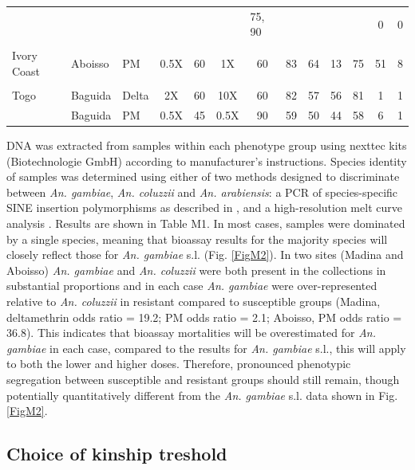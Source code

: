 \documentclass[a4paper,12pt]{article}
\begin{document}
\begin{table}[htbp]
\begin{tabular}{|l|l|l|c|c|c|c|c|c|c|c|c|c|}
 & & & & & & \multicolumn{1}{l|}{75, 90} & & & & & 0 & 0 \\ 
      &          &       &      &    &    &    &    &    &   &   &    &    \\ \hline
Ivory Coast  & Aboisso & PM & 0.5X & 60 & 1X & 60 & 83 & 64 & 13 & 75 & 51 & 8 \\ 
      &          &       &      &    &    &    &    &    &   &   &    &    \\ \hline
Togo & Baguida & Delta & 2X & 60 & 10X & 60 & 82 & 57 & 56 & 81 & 1 & 1 \\ 
 & Baguida & PM & 0.5X & 45 & 0.5X & 90 & 59 & 50 & 44 & 58 & 6 & 1 \\ \hline
\end{tabular}
\label{TabM1}
\end{table}

DNA was extracted from samples within each phenotype group using nexttec kits (Biotechnologie GmbH) according to manufacturer’s instructions. Species identity of samples was determined using either of two methods designed to discriminate between \textit{An. gambiae}, \textit{An. coluzzii} and \textit{An. arabiensis}: a PCR of species-specific SINE insertion polymorphisms as described in \cite{San08}, and a high-resolution melt curve analysis \cite{Cha18}. Results are shown in Table M1. In most cases, samples were dominated by a single species, meaning that bioassay results for the majority species will closely reflect those for \textit{An. gambiae} s.l. (Fig. \ref{FigM2}). In two sites (Madina and Aboisso) \textit{An. gambiae} and \textit{An. coluzzii} were both present in the collections in substantial proportions and in each case \textit{An. gambiae} were over-represented relative to \textit{An. coluzzii} in resistant compared to susceptible groups (Madina, deltamethrin odds ratio = 19.2; PM odds ratio = 2.1; Aboisso, PM odds ratio = 36.8). This indicates that bioassay mortalities will be overestimated for \textit{An. gambiae} in each case, compared to the results for \textit{An. gambiae} s.l., this will apply to both the lower and higher doses. Therefore, pronounced phenotypic segregation between susceptible and resistant groups should still remain, though potentially quantitatively different from the \textit{An. gambiae} s.l. data shown in Fig. \ref{FigM2}.

\clearpage

\subsection{Choice of kinship treshold}
\end{document}
